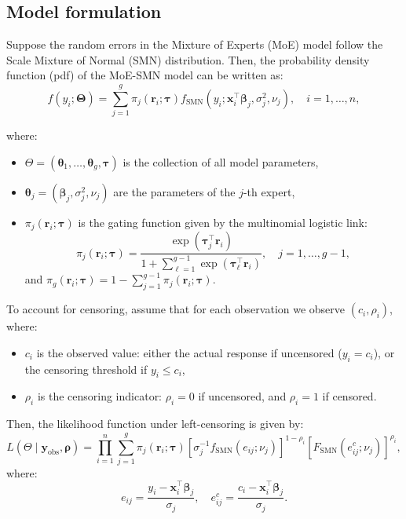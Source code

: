 \documentclass[10.5pt]{article} %
\begin{document}
\subsection{Model formulation}

Suppose the random errors in the Mixture of Experts (MoE) model follow the Scale Mixture of Normal (SMN) distribution. Then, the probability density function (pdf) of the MoE-SMN model can be written as:
\[
f(y_i; \bm{\Theta}) = \sum_{j=1}^{g} \pi_j(\bm{r}_i; \bm{\tau}) 
f_{\text{SMN}}\left(y_i; \bm{x}_i^\top \bm{\beta}_j, \sigma_j^2, \nu_j\right), 
\quad i = 1, \dots, n,
\]

\newpage

\noindent
where:
\begin{itemize}
    \item $\Theta = (\boldsymbol{\theta}_1, \dots, \boldsymbol{\theta}_g, \boldsymbol{\tau})$ is the collection of all model parameters,
    \item $\boldsymbol{\theta}_j = (\boldsymbol{\beta}_j, \sigma_j^2, \nu_j)$ are the parameters of the $j$-th expert,
    \item $\pi_j(\mathbf{r}_i; \boldsymbol{\tau})$ is the gating function given by the multinomial logistic link:
    \[
    \pi_j(\mathbf{r}_i; \boldsymbol{\tau}) = \frac{\exp(\boldsymbol{\tau}_j^\top \mathbf{r}_i)}{1 + \sum_{\ell=1}^{g-1} \exp(\boldsymbol{\tau}_\ell^\top \mathbf{r}_i)}, \quad j = 1, \dots, g-1,
    \]
    and $\pi_g(\mathbf{r}_i; \boldsymbol{\tau}) = 1 - \sum_{j=1}^{g-1} \pi_j(\mathbf{r}_i; \boldsymbol{\tau})$.
\end{itemize}

\noindent
To account for censoring, assume that for each observation we observe $(c_i, \rho_i)$, where:
\begin{itemize}
    \item $c_i$ is the observed value: either the actual response if uncensored ($y_i = c_i$), or the censoring threshold if $y_i \leq c_i$,
    \item $\rho_i$ is the censoring indicator: $\rho_i = 0$ if uncensored, and $\rho_i = 1$ if censored.
\end{itemize}

\noindent
Then, the likelihood function under left-censoring is given by:
\[
L(\Theta \mid \mathbf{y}_{\text{obs}}, \boldsymbol{\rho}) = \prod_{i=1}^{n} \sum_{j=1}^{g} \pi_j(\mathbf{r}_i; \boldsymbol{\tau}) \left[ \sigma_j^{-1} f_{\text{SMN}}(e_{ij}; \nu_j) \right]^{1 - \rho_i} \left[ F_{\text{SMN}}(e_{ij}^c; \nu_j) \right]^{\rho_i},
\]
where:
\[
e_{ij} = \frac{y_i - \mathbf{x}_i^\top \boldsymbol{\beta}_j}{\sigma_j}, \quad 
e_{ij}^c = \frac{c_i - \mathbf{x}_i^\top \boldsymbol{\beta}_j}{\sigma_j}.
\]
\end{document}

